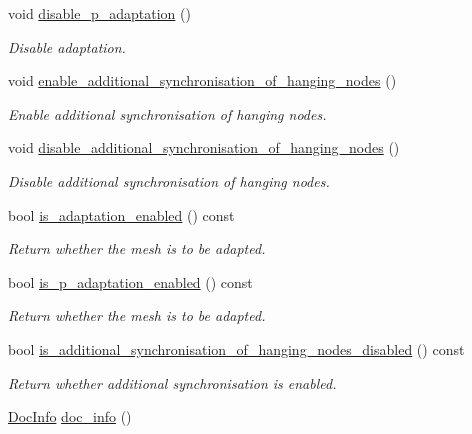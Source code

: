 \begin{DoxyCompactItemize}
void \hyperlink{classoomph_1_1RefineableMeshBase_a7265c7cdcf5ac2c9a043739eb9497aec}{disable\+\_\+p\+\_\+adaptation} ()
\begin{DoxyCompactList}\small\item\em Disable adaptation. \end{DoxyCompactList}\item 
void \hyperlink{classoomph_1_1RefineableMeshBase_a84fbc9d2a8f30d80ea1cf8b3ddd1780e}{enable\+\_\+additional\+\_\+synchronisation\+\_\+of\+\_\+hanging\+\_\+nodes} ()
\begin{DoxyCompactList}\small\item\em Enable additional synchronisation of hanging nodes. \end{DoxyCompactList}\item 
void \hyperlink{classoomph_1_1RefineableMeshBase_ad5d1de773c7941afa18ee9fee35f1c4f}{disable\+\_\+additional\+\_\+synchronisation\+\_\+of\+\_\+hanging\+\_\+nodes} ()
\begin{DoxyCompactList}\small\item\em Disable additional synchronisation of hanging nodes. \end{DoxyCompactList}\item 
bool \hyperlink{classoomph_1_1RefineableMeshBase_a95936de8451623e899f26a80c7b056b5}{is\+\_\+adaptation\+\_\+enabled} () const
\begin{DoxyCompactList}\small\item\em Return whether the mesh is to be adapted. \end{DoxyCompactList}\item 
bool \hyperlink{classoomph_1_1RefineableMeshBase_a9e85bf51c80e88bfc505ddb40115af4f}{is\+\_\+p\+\_\+adaptation\+\_\+enabled} () const
\begin{DoxyCompactList}\small\item\em Return whether the mesh is to be adapted. \end{DoxyCompactList}\item 
bool \hyperlink{classoomph_1_1RefineableMeshBase_a87ba874aa6fd4bcd80bcffd2fa0465da}{is\+\_\+additional\+\_\+synchronisation\+\_\+of\+\_\+hanging\+\_\+nodes\+\_\+disabled} () const
\begin{DoxyCompactList}\small\item\em Return whether additional synchronisation is enabled. \end{DoxyCompactList}\item 
\hyperlink{classoomph_1_1DocInfo}{Doc\+Info} \hyperlink{classoomph_1_1RefineableMeshBase_a266f8b2a1499cc2ae7b24b19813923ee}{doc\+\_\+info} ()

\end{DoxyCompactItemize}
